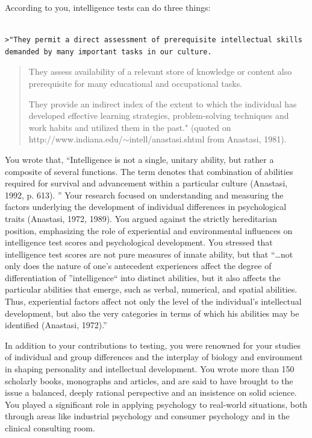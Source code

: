 According to you, intelligence tests can do three things:

\begin{adjustwidth}{2.5em}{2.5em}
\begin{verbatim}

>"They permit a direct assessment of prerequisite intellectual skills demanded by many important tasks in our culture.

\end{verbatim}
\end{adjustwidth}

\begin{quote}

They assess availability of a relevant store of knowledge or content also prerequisite for many educational and occupational tasks.

They provide an indirect index of the extent to which the individual has developed effective learning strategies, problem-solving techniques and work habits and utilized them in the past." (quoted on http:\slash \slash www.indiana.edu\slash \ensuremath{\sim}intell\slash anastasi.shtml from Anastasi, 1981).
\end{quote}

You wrote that, ``Intelligence is not a single, unitary ability, but rather a composite of several functions. The term denotes that combination of abilities required for survival and advancement within a particular culture (Anastasi, 1992, p. 613). '' Your research focused on understanding and measuring the factors underlying the development of individual differences in psychological traits (Anastasi, 1972, 1989). You argued against the strictly hereditarian position, emphasizing the role of experiential and environmental influences on intelligence test scores and psychological development. You stressed that intelligence test scores are not pure measures of innate ability, but that ``{\ldots}not only does the nature of one's antecedent experiences affect the degree of differentiation of ''intelligence`` into distinct abilities, but it also affects the particular abilities that emerge, such as verbal, numerical, and spatial abilities. Thus, experiential factors affect not only the level of the individual's intellectual development, but also the very categories in terms of which his abilities may be identified (Anastasi, 1972).''

In addition to your contributions to testing, you were renowned for your studies of individual and group differences and the interplay of biology and environment in shaping personality and intellectual development. You wrote more than 150 scholarly books, monographs and articles, and are said to have brought to the issue a balanced, deeply rational perspective and an insistence on solid science. You played a significant role in applying psychology to real-world situations, both through areas like industrial psychology and consumer psychology and in the clinical consulting room.

